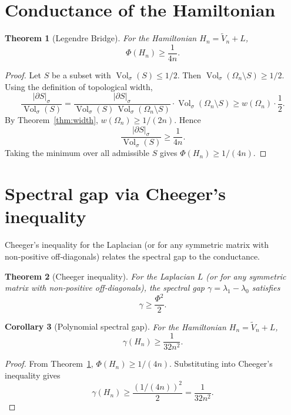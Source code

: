 \documentclass[11pt,a4paper]{article}
\newtheorem{theorem}{Theorem}[section]
\newtheorem{corollary}[theorem]{Corollary}
\begin{document}
\section{Conductance of the Hamiltonian}

\begin{theorem}[Legendre Bridge]\label{thm:conductance}
For the Hamiltonian $H_n = \tilde{V}_n + L$,
\[
\Phi(H_n) \ge \frac{1}{4n}.
\]
\end{theorem}
\begin{proof}
Let $S$ be a subset with $\operatorname{Vol}_\sigma(S)\le 1/2$. Then $\operatorname{Vol}_\sigma(\Omega_n\setminus S) \ge 1/2$. Using the definition of topological width,
\[
\frac{|\partial S|_\sigma}{\operatorname{Vol}_\sigma(S)} =
\frac{|\partial S|_\sigma}{\operatorname{Vol}_\sigma(S)\,\operatorname{Vol}_\sigma(\Omega_n\setminus S)}\cdot \operatorname{Vol}_\sigma(\Omega_n\setminus S)
\ge w(\Omega_n)\cdot \frac{1}{2}.
\]
By Theorem~\ref{thm:width}, $w(\Omega_n) \ge 1/(2n)$. Hence
\[
\frac{|\partial S|_\sigma}{\operatorname{Vol}_\sigma(S)} \ge \frac{1}{4n}.
\]
Taking the minimum over all admissible $S$ gives $\Phi(H_n) \ge 1/(4n)$.
\end{proof}

\section{Spectral gap via Cheeger's inequality}

Cheeger's inequality for the Laplacian (or for any symmetric matrix with non‑positive off‑diagonals) relates the spectral gap to the conductance.

\begin{theorem}[Cheeger inequality]\label{thm:cheeger}
For the Laplacian $L$ (or for any symmetric matrix with non‑positive off‑diagonals), the spectral gap $\gamma = \lambda_1 - \lambda_0$ satisfies
\[
\gamma \ge \frac{\Phi^2}{2}.
\]
\end{theorem}

\begin{corollary}[Polynomial spectral gap]\label{cor:gap}
For the Hamiltonian $H_n = \tilde{V}_n + L$,
\[
\gamma(H_n) \ge \frac{1}{32n^2}.
\]
\end{corollary}
\begin{proof}
From Theorem~\ref{thm:conductance}, $\Phi(H_n) \ge 1/(4n)$. Substituting into Cheeger's inequality gives
\[
\gamma(H_n) \ge \frac{(1/(4n))^2}{2} = \frac{1}{32n^2}.
\]
\end{proof}
\end{document}
